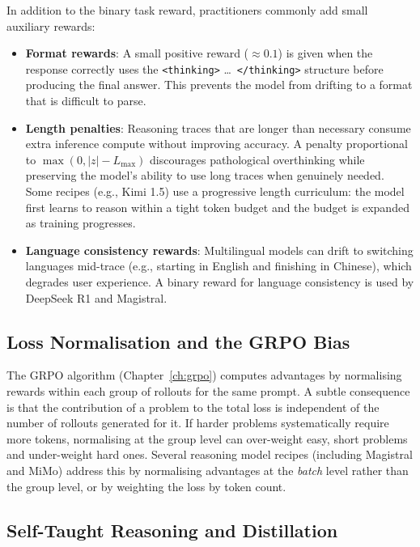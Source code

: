 In addition to the binary task reward, practitioners commonly add
small auxiliary rewards:

\begin{itemize}[leftmargin=*]
\item \textbf{Format rewards}: A small positive reward ($\approx 0.1$)
  is given when the response correctly uses the \texttt{<thinking>}
  \ldots\ \texttt{</thinking>} structure before producing the final
  answer. This prevents the model from drifting to a format that is
  difficult to parse.

\item \textbf{Length penalties}: Reasoning traces that are longer than
  necessary consume extra inference compute without improving accuracy.
  A penalty proportional to $\max(0, |z| - L_{\max})$ discourages
  pathological overthinking while preserving the
  model's ability to use long traces when genuinely needed. Some
  recipes (e.g., Kimi 1.5) use a progressive length curriculum:
  the model first learns to reason within a tight token budget and
  the budget is expanded as training progresses.

\item \textbf{Language consistency rewards}: Multilingual models can
  drift to switching languages mid-trace (e.g., starting in English
  and finishing in Chinese), which degrades user experience. A binary
  reward for language consistency is used by DeepSeek R1 and Magistral.
\end{itemize}

\subsection{Loss Normalisation and the GRPO Bias}
\label{subsec:loss-norm}

The GRPO algorithm (Chapter~\ref{ch:grpo}) computes advantages by
normalising rewards within each group of rollouts for the same
prompt. A subtle consequence is that the contribution of a problem
to the total loss is independent of the number of rollouts generated
for it. If harder problems systematically require more tokens,
normalising at the group level can over-weight easy, short problems
and under-weight hard ones. Several reasoning model recipes
(including Magistral and MiMo) address this by normalising advantages
at the \emph{batch} level rather than the group level, or by
weighting the loss by token count.

\subsection{Self-Taught Reasoning and Distillation}
\label{subsec:star-distill}

